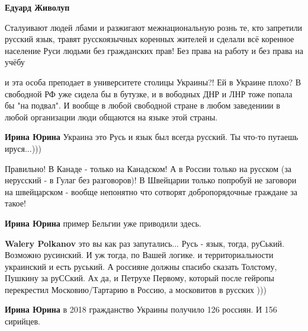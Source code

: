 \begin{itemize}
\begin{itemize}
\textbf{Едуард Живолуп} 

Сталуивают людей лбами и разжигают межнациональную
рознь те, кто запретили русский язык, травят русскоязычных коренных жителей и
сделали всё коренное население Руси людьми без гражданских прав! Без права на
работу и без права на учёбу
\end{itemize}


и эта особа преподает в университете столицы Украины?! Ей в Украине плохо? В
свободной РФ уже сидела бы в бутузке, и в вободных ДНР и ЛНР тоже попала бы "на
подвал". И вообще в любой свободной стране в любом заведениии в любой
организации люди общаются на языке этой страны.

\begin{itemize}

\textbf{Ирина Юрина} Украина это Русь и язык был всегда русский. Ты что-то путаешь ируся...)))



Правильно! В Канаде - только на Канадском! А в России только на русском (за
нерусский - в Гулаг без разговоров)! В Швейцарии только попробуй не заговори на
швейцарском - вообще непонятно что сотворят добропорядочные граждане за такое!


\textbf{Ирина Юрина} пример Бельгии уже приводили здесь.


\textbf{Walery Polkanov} это вы как раз запутались... Русь - язык, тогда,
руСький. Возможно русинский. И уж тогда, по Вашей логике. и территориальности
украинский и есть руський. А россияне должны спасибо сказать Толстому, Пушкину
за руССкий. Ах да, и Петрухе Первому, который после гейропы перекрестил
Московию/Тартарию в Россию, а московитов в русских )))


\textbf{Ирина Юрина} в 2018 гражданство Украины получило 126 россиян. И 156 сирийцев.


\end{itemize}
\end{itemize}
